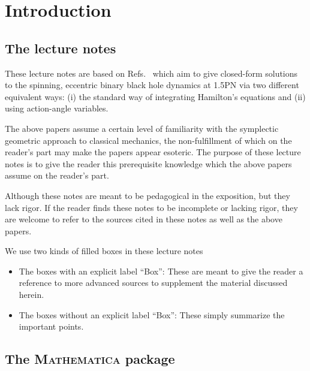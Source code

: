 \chapter{Introduction}


\section{The lecture notes}


These lecture notes are based on Refs.~\cite{tanay2021action, tanay2021integrability, Cho:2019brd}
 which aim to give closed-form solutions to the spinning, eccentric
binary black hole dynamics at 1.5PN via two different equivalent ways: (i)
the standard way of integrating Hamilton's equations and (ii) using action-angle variables.



The above papers assume a certain level of familiarity
with the symplectic geometric approach to classical mechanics, the non-fulfillment
of which on the reader's part may make the papers appear esoteric.
The purpose of these lecture notes is to give the reader this prerequisite
 knowledge which the above papers assume on the reader's part. 

Although these notes are meant to be pedagogical 
in the exposition, but they
lack rigor. If the reader 
finds these notes to be incomplete or lacking rigor, they are welcome to
refer to the sources cited in these notes as well as the above papers.



We use two kinds of filled boxes in these lecture notes
\begin{itemize}
\item The boxes with an explicit label ``Box'': These are meant
to give the reader a reference to more advanced sources to supplement
the material discussed herein. 
\item The boxes without an explicit label ``Box'': These simply 
summarize the important points.
\end{itemize}


\section{The \textsc{Mathematica} package}

